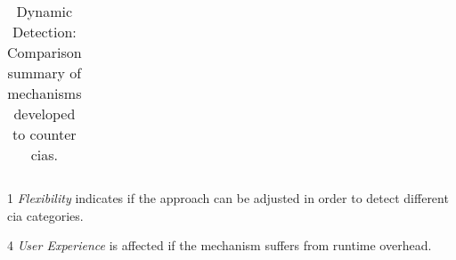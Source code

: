 \documentclass[conference]{IEEEtran}
\begin{document}
\begin{table*}
\begin{threeparttable}
\begin{small}
{\begin{tabular}{l|c|cc|c}
	\hline
    \end{tabular}}
    \begin{tablenotes}
	\begin{footnotesize}
       \item[1] {\it Flexibility} indicates if the approach can be adjusted
	in order to detect different {\sc cia} categories.
       \item[4] {\it User Experience} is affected if the mechanism suffers
	from runtime overhead.
	\end{footnotesize}
    \end{tablenotes}
    \caption{Dynamic Detection: Comparison summary of mechanisms developed to counter {\sc cia}s.}
    \label{tab:comp2}
    \end{small}
    \end{threeparttable}
\end{table*}



\end{document}
